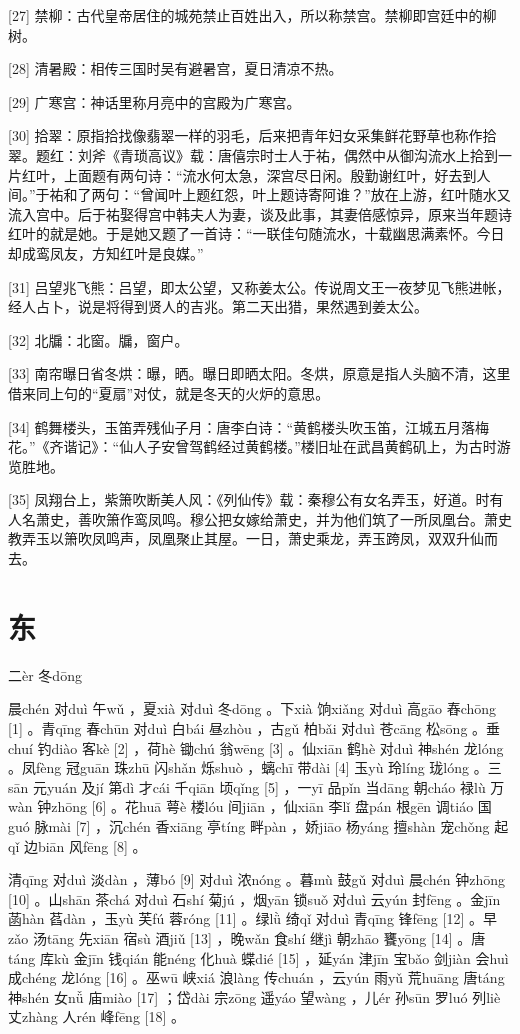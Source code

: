 \documentclass[12pt,UTF8]{ctexbook}
\begin{document}
[27] 禁柳：古代皇帝居住的城苑禁止百姓出入，所以称禁宫。禁柳即宫廷中的柳树。

[28] 清暑殿：相传三国时吴有避暑宫，夏日清凉不热。

[29] 广寒宫：神话里称月亮中的宫殿为广寒宫。

[30] 拾翠：原指拾找像翡翠一样的羽毛，后来把青年妇女采集鲜花野草也称作拾翠。题红：刘斧《青琐高议》载：唐僖宗时士人于祐，偶然中从御沟流水上拾到一片红叶，上面题有两句诗：“流水何太急，深宫尽日闲。殷勤谢红叶，好去到人间。”于祐和了两句：“曾闻叶上题红怨，叶上题诗寄阿谁？”放在上游，红叶随水又流入宫中。后于祐娶得宫中韩夫人为妻，谈及此事，其妻倍感惊异，原来当年题诗红叶的就是她。于是她又题了一首诗：“一联佳句随流水，十载幽思满素怀。今日却成鸾凤友，方知红叶是良媒。”

[31] 吕望兆飞熊：吕望，即太公望，又称姜太公。传说周文王一夜梦见飞熊进帐，经人占卜，说是将得到贤人的吉兆。第二天出猎，果然遇到姜太公。

[32] 北牖：北窗。牖，窗户。

[33] 南帘曝日省冬烘：曝，晒。曝日即晒太阳。冬烘，原意是指人头脑不清，这里借来同上句的“夏扇”对仗，就是冬天的火炉的意思。

[34] 鹤舞楼头，玉笛弄残仙子月：唐李白诗：“黄鹤楼头吹玉笛，江城五月落梅花。”《齐谐记》：“仙人子安曾驾鹤经过黄鹤楼。”楼旧址在武昌黄鹤矶上，为古时游览胜地。

[35] 凤翔台上，紫箫吹断美人风：《列仙传》载：秦穆公有女名弄玉，好道。时有人名萧史，善吹箫作鸾凤鸣。穆公把女嫁给萧史，并为他们筑了一所凤凰台。萧史教弄玉以箫吹凤鸣声，凤凰聚止其屋。一日，萧史乘龙，弄玉跨凤，双双升仙而去。




\chapter{东}
二èr 冬dōng


晨chén 对duì 午wǔ ，夏xià 对duì 冬dōng 。下xià 饷xiǎng 对duì 高gāo 舂chōng [1] 。青qīng 春chūn 对duì 白bái 昼zhòu ，古gǔ 柏bǎi 对duì 苍cāng 松sōng 。垂chuí 钓diào 客kè [2] ，荷hè 锄chú 翁wēng [3] 。仙xiān 鹤hè 对duì 神shén 龙lóng 。凤fèng 冠guān 珠zhū 闪shǎn 烁shuò ，螭chī 带dài [4] 玉yù 玲líng 珑lóng 。三sān 元yuán 及jí 第dì 才cái 千qiān 顷qǐng [5] ，一yī 品pǐn 当dāng 朝cháo 禄lù 万wàn 钟zhōng [6] 。花huā 萼è 楼lóu 间jiān ，仙xiān 李lǐ 盘pán 根gēn 调tiáo 国guó 脉mài [7] ，沉chén 香xiāng 亭tíng 畔pàn ，娇jiāo 杨yáng 擅shàn 宠chǒng 起qǐ 边biān 风fēng [8] 。

清qīng 对duì 淡dàn ，薄bó [9] 对duì 浓nóng 。暮mù 鼓gǔ 对duì 晨chén 钟zhōng [10] 。山shān 茶chá 对duì 石shí 菊jú ，烟yān 锁suǒ 对duì 云yún 封fēng 。金jīn 菡hàn 萏dàn ，玉yù 芙fú 蓉róng [11] 。绿lǜ 绮qǐ 对duì 青qīng 锋fēng [12] 。早zǎo 汤tāng 先xiān 宿sù 酒jiǔ [13] ，晚wǎn 食shí 继jì 朝zhāo 饔yōng [14] 。唐táng 库kù 金jīn 钱qián 能néng 化huà 蝶dié [15] ，延yán 津jīn 宝bǎo 剑jiàn 会huì 成chéng 龙lóng [16] 。巫wū 峡xiá 浪làng 传chuán ，云yún 雨yǔ 荒huāng 唐táng 神shén 女nǚ 庙miào [17] ；岱dài 宗zōng 遥yáo 望wàng ，儿ér 孙sūn 罗luó 列liè 丈zhàng 人rén 峰fēng [18] 。
\end{document}

